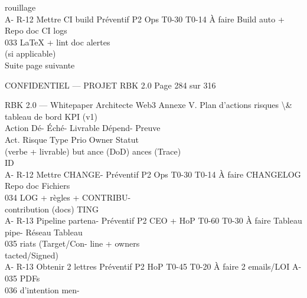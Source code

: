 rouillage\\
A- R-12     Mettre CI build      Préventif P2   Ops         T0-30 T0-14 À faire   Build auto +    Repo doc CI logs\\
033         LaTeX + lint doc                                                      alertes\\
(si applicable)\\
Suite page suivante\\
\vspace{0.5em}
\vspace{0.5em}
\vspace{0.5em}
\vspace{0.5em}
\begin{confidential}CONFIDENTIEL — PROJET RBK 2.0                                          Page 284 sur 316\end{confidential}
RBK 2.0 — Whitepaper Architecte Web3                                                                 Annexe V. Plan d’actions risques \textbackslash{}& tableau de bord KPI (v1)\\
\vspace{0.5em}
\vspace{0.5em}
Action                                           Dé- Éché-             Livrable        Dépend- Preuve\\
Act. Risque                      Type      Prio Owner                    Statut\\
(verbe + livrable)                               but ance              (DoD)           ances   (Trace)\\
ID\\
A- R-12     Mettre CHANGE-       Préventif P2   Ops          T0-30 T0-14 À faire   CHANGELOG Repo doc Fichiers\\
034         LOG + règles                                                           + CONTRIBU-\\
contribution (docs)                                                    TING\\
A- R-13     Pipeline partena-    Préventif P2   CEO + HoP T0-60 T0-30 À faire      Tableau pipe- Réseau Tableau\\
035         riats (Target/Con-                                                     line + owners\\
tacted/Signed)\\
A- R-13     Obtenir 2 lettres    Préventif P2   HoP          T0-45 T0-20 À faire   2 emails/LOI    A-035      PDFs\\
036         d’intention men-\\
